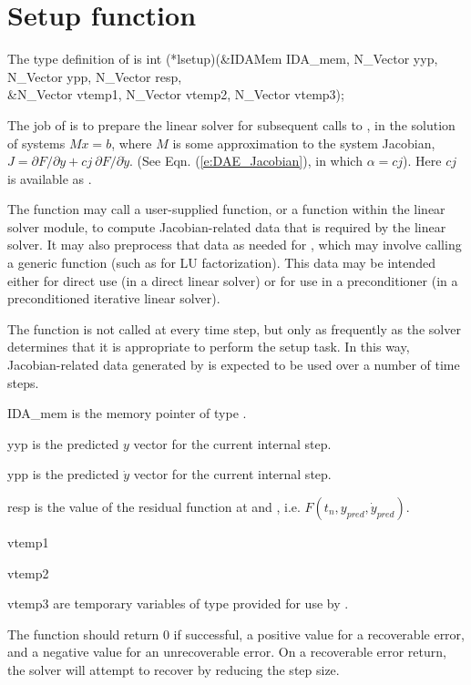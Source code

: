 
\section{Setup function} 
The type definition of  is
{
   int (*lsetup)(&IDAMem IDA\_mem, N\_Vector yyp, N\_Vector ypp, 
                 N\_Vector resp,\\
                 &N\_Vector vtemp1, N\_Vector vtemp2, N\_Vector vtemp3); 
}
{
  The job of  is to prepare the linear solver for subsequent 
  calls to , in the solution of systems $M x = b$, where         
  $M$ is some approximation to the system Jacobian,
  $J = \partial F / \partial y + cj ~ \partial F / \partial \dot{y}$. 
  (See Eqn. (\ref{e:DAE_Jacobian}), in which $\alpha = cj$).
  Here $cj$ is available as .

  The  function may call a user-supplied function, or a function
  within the linear solver module, to compute Jacobian-related data
  that is required by the linear solver.  It may also preprocess that
  data as needed for , which may involve calling a generic
  function (such as for LU factorization).  This data may be intended
  either for direct use (in a direct linear solver) or for use in a
  preconditioner (in a preconditioned iterative linear solver).

  The  function is not called at every time step, but only
  as frequently as the solver determines that it is appropriate to perform
  the setup task.  In this way, Jacobian-related data generated by 
  is expected to be used over a number of time steps.
}
{
   \begin{args}
   \item[IDA\_mem] 
     is the {\ida} memory pointer of type .
  
   \item[yyp]
     is the predicted $y$ vector for the current {\ida} internal step.
  
   \item[ypp]
     is the predicted $\dot{y}$ vector for the current {\ida} internal step.
  
   \item[resp]
     is the value of the residual function at  and , i.e.
     $F(t_n, y_{pred}, \dot{y}_{pred})$.
  
   \item[vtemp1] 
   \item[vtemp2]
   \item[vtemp3] 
     are temporary variables of type  provided for use by .      
  
   \end{args}
}
{
  The  function should return 0 if successful,            
  a positive value for a recoverable error, and a negative value  
  for an unrecoverable error.  On a recoverable error return, the
  solver will attempt to recover by reducing the step size.
}
{}

